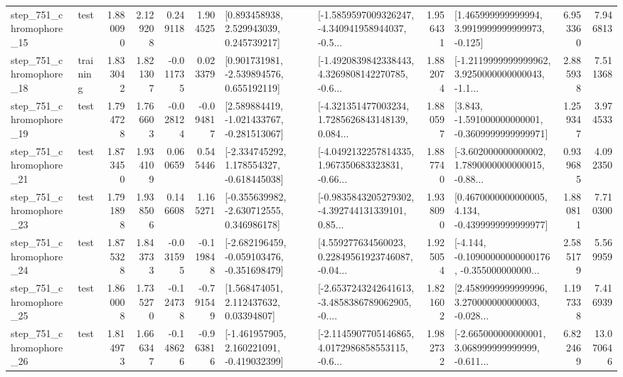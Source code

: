 \begin{tabular}{llrrrrllrlrr}
  step\_751\_chromophore\_15 &      test &      1.880090 &    2.129208 &      0.249118 &  1.904525 &     [0.893458938, 2.529943039, 0.245739217] &  [-1.5859597009326247, -4.340941958944037, -0.5... &       1.956431 &    [1.465999999999994, 3.9919999999999973, -0.125] &            6.953360 &          7.946813 \\
  step\_751\_chromophore\_18 &  training &      1.833042 &    1.821307 &     -0.011735 &  0.023379 &    [0.901731981, -2.539894576, 0.655192119] &  [-1.4920839842338443, 4.3269808142270785, -0.6... &       1.882074 &  [-1.2119999999999962, 3.9250000000000043, -1.1... &            2.885938 &          7.511368 \\
  step\_751\_chromophore\_19 &      test &      1.794728 &    1.766603 &     -0.028124 & -0.094817 &   [2.589884419, -1.021433767, -0.281513067] &  [-4.321351477003234, 1.7285626843148139, 0.084... &       1.880597 &   [3.843, -1.591000000000001, -0.3609999999999971] &            1.259347 &          3.974533 \\
  step\_751\_chromophore\_21 &      test &      1.873450 &    1.934109 &      0.060659 &  0.545446 &   [-2.334745292, 1.178554327, -0.618445038] &  [-4.0492132257814335, 1.967350683323831, -0.66... &       1.887740 &  [-3.602000000000002, 1.7890000000000015, -0.88... &            0.939685 &          4.092350 \\
  step\_751\_chromophore\_23 &      test &      1.791898 &    1.938506 &      0.146608 &  1.165271 &   [-0.355639982, -2.630712555, 0.346986178] &  [-0.9835843205279302, -4.392744131339101, 0.85... &       1.938090 &   [0.4670000000000005, 4.134, -0.4399999999999977] &            1.880811 &          7.710300 \\
  step\_751\_chromophore\_24 &      test &      1.875328 &    1.843733 &     -0.031595 & -0.119848 &  [-2.682196459, -0.059103476, -0.351698479] &  [4.559277634560023, 0.22849561923746087, -0.04... &       1.925054 &  [-4.144, -0.10900000000000176, -0.355000000000... &            2.585179 &          5.569959 \\
  step\_751\_chromophore\_25 &      test &      1.860008 &    1.735270 &     -0.124738 & -0.791549 &      [1.568474051, 2.112437632, 0.03394807] &  [-2.6537243242641613, -3.4858386789062905, -0.... &       1.821602 &  [2.4589999999999996, 3.270000000000003, -0.028... &            1.197338 &          7.416939 \\
  step\_751\_chromophore\_26 &      test &      1.814973 &    1.666347 &     -0.148626 & -0.963816 &   [-1.461957905, 2.160221091, -0.419032399] &  [-2.1145907705146865, 4.0172986858553115, -0.6... &       1.982732 &  [-2.665000000000001, 3.068999999999999, -0.611... &            6.822469 &         13.070646 \\

\end{tabular}
